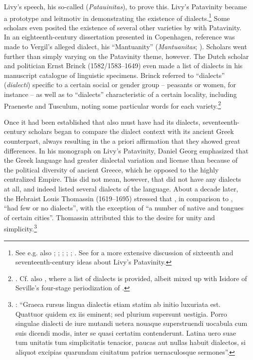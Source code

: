 Livy’s speech, his so-called  (\textit{Patauinitas}), to prove this. Livy’s Patavinity became a prototype and leitmotiv in demonstrating the existence of  dialects.\footnote{See e.g. also \citet[b.viii\textsc{\textsuperscript{v}}]{Castiglione1528}; \citet[*.iii\textsc{\textsuperscript{r}}]{Estienne1582}; \citet[174, 176]{Schottel1663}; \citet[311]{Rice1765}; \citet[: \textsc{lix}]{Mazzarella-farao1779}; \citet[203--204]{Ries1786}. See \citet{VanRooy2018a} for a more extensive discussion of sixteenth and seventeenth-century ideas about Livy’s Patavinity.} Some scholars even posited the existence of several other  varieties by  with Patavinity. In an eighteenth-century dissertation presented in Copenhagen, reference was made to Vergil’s alleged  dialect, his “Mantuanity” (\textit{Mantuanitas}; \citealt[22]{Munthe1748}). Scholars went further than simply varying on the Patavinity theme, however. The Dutch scholar and politician Ernst Brinck (1582/1583–1649) even made a list of  dialects in his manuscript catalogue of linguistic specimens. Brinck referred to “dialects” (\textit{dialecti}) specific to a certain social or gender group – peasants or women, for instance – as well as to “dialects” characteristic of a certain locality, including Praeneste and Tusculum, noting some particular words for each variety.\footnote{\citet[56\textsc{\textsuperscript{v}}]{Brinck1615}. Cf. also \citet[43]{Stubbe1657}, where a list of  dialects is provided, albeit mixed up with Isidore of Seville’s four-stage periodization of .}

Once it had been established that  also must have had its dialects, seven\-teenth-century scholars began to compare the  dialect context with its ancient Greek counterpart, always resulting in the a priori affirmation that they showed great differences. In his monograph on Livy’s Patavinity, Daniel Georg \citet[146]{Morhof1685} emphasized that the Greek language had greater dialectal variation and license than  because of the political diversity of ancient Greece, which he opposed to the highly centralized  Empire. This did not mean, however, that  did not have any dialects at all, and \citet[148--149]{Morhof1685} indeed listed several dialects of the language. About a decade later, the Hebraist Louis Thomassin (1619–1695) stressed that , in comparison to , “had few or no dialects”, with the exception of “a number of native and  tongues of certain cities”. Thomassin attributed this to the  desire for unity and simplicity.\footnote{\citet[xix]{Thomassin1697}: “Graeca rursus lingua dialectis etiam statim ab initio luxuriata est. Quattuor quidem ex iis eminent; sed plurium supersunt uestigia. Porro singulae dialecti de iure mutandi uetera nouaque superstruendi uocabula cum suis dicendi modis, inter se quasi certatim contenderunt. Latina uero suae tum unitatis tum simplicitatis tenacior, paucas aut nullas habuit dialectos, si aliquot excipias quarundam ciuitatum patrios uernaculosque sermones”.}

